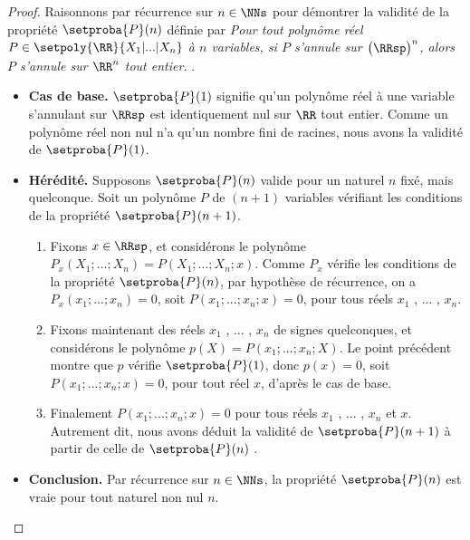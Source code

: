 \begin{proof}
	Raisonnons par récurrence sur $n \in \NNs$ pour démontrer la validité de la propriété $\setproba{P}(n)$ définie par
	\emph{\og 
		Pour tout polynôme réel $P \in \setpoly{\RR}{X_1 | ... | X_n}$ à $n$ variables,
		si $P$ s'annule sur $\big( \RRsp \big)^n$,
		alors $P$ s'annule sur $\RR^n$ tout entier. 
	\fg}.
	\begin{itemize}[label=\small\textbullet]
		\item \textbf{Cas de base.}
		$\setproba{P}(1)$ signifie qu'un polynôme réel à une variable s'annulant sur $\RRsp$ est identiquement nul sur $\RR$ tout entier.
		Comme un polynôme réel non nul n'a qu'un nombre fini de racines, nous avons la validité de $\setproba{P}(1)$.


		\item \textbf{Hérédité.}
		Supposons $\setproba{P}(n)$ valide pour un naturel $n$ fixé, mais quelconque.
		Soit un polynôme $P$ de $(n + 1)$ variables vérifiant les conditions de la propriété $\setproba{P}(n + 1)$.
		\begin{enumerate}
		    \item Fixons $x \in \RRsp$, et considérons le polynôme $P_x(X_1 ; ... ; X_n) = P(X_1 ; ... ; X_n ; x)$.
		    Comme $P_x$ vérifie les conditions de la propriété $\setproba{P}(n)$, par hypothèse de récurrence, on a
		    $P_x(x_1 ; ... ; x_n) = 0$, soit $P(x_1 ; ... ; x_n ; x) = 0$, pour tous réels $x_1$ , ... , $x_n$.


		    \item Fixons maintenant des réels $x_1$ , ... , $x_n$ de signes quelconques, et considérons le polynôme $p(X) = P(x_1 ; ... ; x_n ; X)$.
		    Le point précédent montre que $p$ vérifie $\setproba{P}(1)$, donc $p(x) = 0$, soit $P(x_1 ; ... ; x_n ; x) = 0$, pour tout réel $x$, d'après le cas de base.


		    \item Finalement $P(x_1 ; ... ; x_n ; x) = 0$ pour tous réels $x_1$ , ... , $x_n$ et $x$.
		    Autrement dit, nous avons déduit la validité de $\setproba{P}(n+1)$ à partir de celle de $\setproba{P}(n)$ .
		\end{enumerate}
		
		
		\item \textbf{Conclusion.}
		Par récurrence sur $n \in \NNs$, la propriété $\setproba{P}(n)$ est vraie pour tout naturel non nul $n$.
	\end{itemize}

	\null\vspace{-6ex}
\end{proof}


